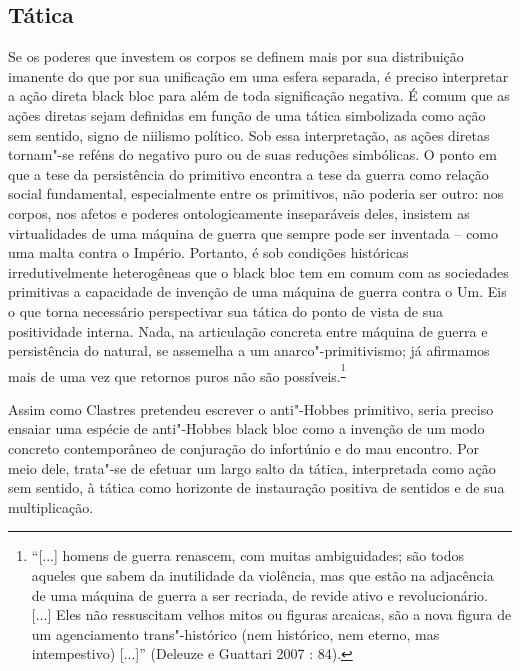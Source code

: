  

\subsection{Tática}

Se os poderes que investem os corpos se definem
mais por sua distribuição imanente do que por sua unificação em uma
esfera separada, é preciso interpretar a ação direta black bloc para
além de toda significação negativa. É comum que as ações diretas sejam
definidas em função de uma tática simbolizada como ação sem sentido,
signo de niilismo político. Sob essa interpretação, as ações diretas
tornam"-se reféns do negativo puro ou de suas reduções simbólicas. O
ponto em que a tese da persistência do primitivo encontra a tese da
guerra como relação social fundamental, especialmente entre os
primitivos, não poderia ser outro: nos corpos, nos afetos e poderes
ontologicamente inseparáveis deles, insistem as virtualidades de uma
máquina de guerra que sempre pode ser inventada -- como uma malta contra
o Império. Portanto, é sob condições históricas irredutivelmente
heterogêneas que o black bloc tem em comum com as sociedades primitivas
a capacidade de invenção de uma máquina de guerra contra o Um. Eis o que
torna necessário perspectivar sua tática do ponto de vista de sua
positividade interna. Nada, na articulação concreta entre máquina de
guerra e persistência do natural, se assemelha a um anarco"-primitivismo;
já afirmamos mais de uma vez que retornos puros não são
possíveis.\textsuperscript{\footnote{``{[}...{]} homens de guerra
  renascem, com muitas ambiguidades; são todos aqueles que sabem da
  inutilidade da violência, mas que estão na adjacência de uma máquina
  de guerra a ser recriada, de revide ativo e revolucionário. {[}...{]}
  Eles não ressuscitam velhos mitos ou figuras arcaicas, são a nova
  figura de um agenciamento trans"-histórico (nem histórico, nem eterno,
  mas intempestivo) {[}...{]}'' (Deleuze e Guattari 2007 : 84).}}

Assim como Clastres pretendeu escrever o anti"-Hobbes primitivo, seria
preciso ensaiar uma espécie de anti"-Hobbes black bloc como a invenção de
um modo concreto contemporâneo de conjuração do infortúnio e do mau
encontro. Por meio dele, trata"-se de efetuar um largo salto da tática,
interpretada como ação sem sentido, à tática como horizonte de
instauração positiva de sentidos e de sua multiplicação.


